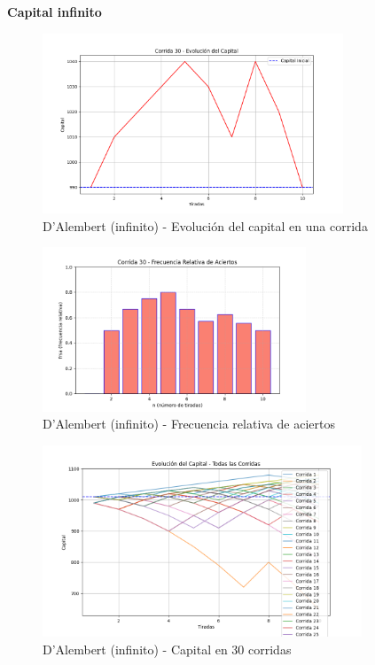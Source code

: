 \documentclass{article}
\begin{document}
\textbf{Capital infinito}

\begin{figure}
    \centering
    \includegraphics[width=0.8\textwidth]{./images/capital_corrida_30_d_i.png}
    \caption{D’Alembert (infinito) - Evolución del capital en una corrida}
\end{figure}

\begin{figure}
    \centering
    \includegraphics[width=0.7\textwidth]{./images/frsa_corrida_30_d_i.png}
    \caption{D’Alembert (infinito) - Frecuencia relativa de aciertos}
\end{figure}

\begin{figure}
    \centering
    \includegraphics[width=0.85\textwidth]{./images/capital_todas_corridas_d_i.png}
    \caption{D’Alembert (infinito) - Capital en 30 corridas}
\end{figure}
\end{document}
